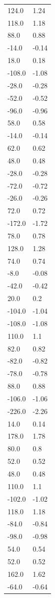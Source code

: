 \begin{longtable}{ll}
124.0 & 1.24 \\
118.0 & 1.18 \\
88.0 & 0.88 \\
-14.0 & -0.14 \\
18.0 & 0.18 \\
-108.0 & -1.08 \\
-28.0 & -0.28 \\
-52.0 & -0.52 \\
-96.0 & -0.96 \\
58.0 & 0.58 \\
-14.0 & -0.14 \\
62.0 & 0.62 \\
48.0 & 0.48 \\
-28.0 & -0.28 \\
-72.0 & -0.72 \\
-26.0 & -0.26 \\
72.0 & 0.72 \\
-172.0 & -1.72 \\
78.0 & 0.78 \\
128.0 & 1.28 \\
74.0 & 0.74 \\
-8.0 & -0.08 \\
-42.0 & -0.42 \\
20.0 & 0.2 \\
-104.0 & -1.04 \\
-108.0 & -1.08 \\
110.0 & 1.1 \\
82.0 & 0.82 \\
-82.0 & -0.82 \\
-78.0 & -0.78 \\
88.0 & 0.88 \\
-106.0 & -1.06 \\
-226.0 & -2.26 \\
14.0 & 0.14 \\
178.0 & 1.78 \\
80.0 & 0.8 \\
52.0 & 0.52 \\
48.0 & 0.48 \\
110.0 & 1.1 \\
-102.0 & -1.02 \\
118.0 & 1.18 \\
-84.0 & -0.84 \\
-98.0 & -0.98 \\
54.0 & 0.54 \\
52.0 & 0.52 \\
162.0 & 1.62 \\
-64.0 & -0.64 \\

\end{longtable}
